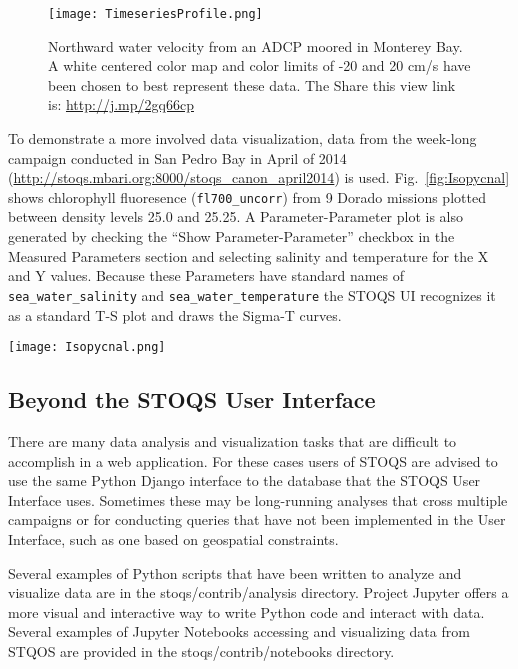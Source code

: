 \documentclass[conference]{IEEEtran}
\begin{document}
\begin{figure}[htbp]
\centering
\texttt{[image: TimeseriesProfile.png]}
\caption{Northward water velocity from an ADCP moored in Monterey Bay. A white centered color map and color
limits of -20 and 20 cm/s have been chosen to best represent these data. The Share this view link is: \url{http://j.mp/2gq66cp}}
\label{fig:TimeseriesProfile}
\end{figure}

To demonstrate a more involved data visualization, data from the week-long
campaign conducted in San Pedro Bay in April of 2014 
(\url{http://stoqs.mbari.org:8000/stoqs_canon_april2014}) is used.
Fig.~\ref{fig:Isopycnal} shows chlorophyll fluoresence (\texttt{fl700\_uncorr}) from 9 Dorado missions 
plotted between density levels 25.0 and 25.25. A Parameter-Parameter plot is also generated
by checking the ``Show Parameter-Parameter'' checkbox in the Measured Parameters section
and selecting salinity and temperature for the X and Y values. Because these Parameters
have standard names of \texttt{sea\_water\_salinity} and \texttt{sea\_water\_temperature} the STOQS
UI recognizes it as a standard T-S plot and draws the Sigma-T curves.

\begin{figure*}[htbp]
\centering
\texttt{[image: Isopycnal.png]}
\caption{Chlorophyll fluoresence measurement from a week-long set of missions by AUV Dorado selected for plotting between isopycnal values of 25.0 and 25.25.}
\label{fig:Isopycnal}
\end{figure*}




\subsection{Beyond the STOQS User Interface}

There are many data analysis and visualization tasks that are difficult to
accomplish in a web application. For these cases users of STOQS are advised to 
use the same Python Django interface to the database that the STOQS User
Interface uses. Sometimes these may be long-running analyses that cross
multiple campaigns or for conducting queries that have not been implemented
in the User Interface, such as one based on geospatial constraints.

Several examples of Python scripts that have been written to analyze and
visualize data are in the stoqs/contrib/analysis directory. Project Jupyter 
offers a more visual and interactive way to write Python code and interact
with data. Several examples of Jupyter Notebooks accessing and visualizing
data from STQOS are provided in the stoqs/contrib/notebooks directory.
\end{document}
